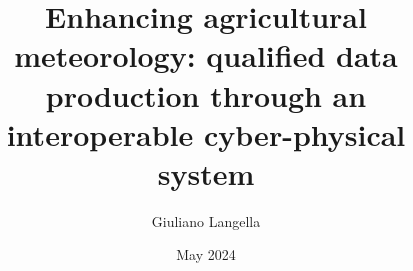 \documentclass[authoryear,preprint,review,12pt]{elsarticle}
\newcommand{\note}[1]{\emph{\textcolor{red}{#1}}}
\newcommand{\review}[1]{\emph{\textcolor{cyan}{#1}}}
\begin{document}
\begin{frontmatter}



\title{Enhancing agricultural meteorology: qualified data production through an interoperable cyber-physical system}


\author[dia,crisp]{Giuliano Langella}
\address[dia]{Department of Agriculture, University of Naples Federico II, Via Università 100, 80055 Portici, NA, Italy}
\address[crisp]{Interdepartmental Research Centre on Earth Critical Zone, University of Naples Federico II, Via Università 100, 80055 Portici, NA, Italy}

\date{May 2024}


\end{frontmatter}
\end{document}
